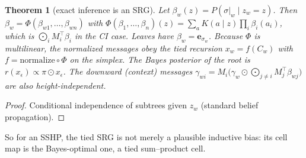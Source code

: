 \documentclass[11pt]{article}
\newtheorem{theorem}{Theorem}[section]
\theoremstyle{definition}
\begin{document}
\begin{theorem}[exact inference is an SRG]\label{thm:bp}
Let $\beta_w(z)=P(\sigma|_w\mid z_w=z)$. Then $\beta_w=\Phi(\beta_{w1},\dots,\beta_{wn})$ with
$\Phi(\beta_1,\dots,\beta_n)(z)=\sum_aK(a\mid z)\prod_i\beta_i(a_i)$, which is
$\bigodot_i M_i^\top\beta_i$ in the CI case. Leaves have $\beta_w=\mathbf e_{\sigma_w}$.
Because $\Phi$ is multilinear, the normalized messages obey the tied recursion
$x_w=f(C_w)$ with $f=\mathrm{normalize}\circ\Phi$ on the simplex. The Bayes posterior of the
root is $r(x_\epsilon)\propto\pi\odot x_\epsilon$. The downward (context) messages
$\gamma_{wi}=M_i\big(\gamma_w\odot\bigodot_{j\ne i}M_j^\top\beta_{wj}\big)$ are also
height-independent.
\end{theorem}
\begin{proof}Conditional independence of subtrees given $z_w$ (standard belief propagation).
\end{proof}
\noindent So for an SSHP, the tied SRG is not merely a plausible inductive bias: its cell map is
the Bayes-optimal one, a tied sum--product cell.
\end{document}
